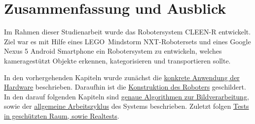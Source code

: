 \chapter{Zusammenfassung und Ausblick}
\label{cha:Fazit}

Im Rahmen dieser Studienarbeit wurde das Robotersystem CLEEN-R entwickelt. Ziel war es mit Hilfe eines LEGO\textregistered\ Mindstorm NXT-Robotersets und eines Google Nexus 5 Android Smartphone ein Robotersystem zu entwickeln, welches kameragestützt Objekte erkennen, kategorisieren und transportieren sollte. 

In den vorhergehenden Kapiteln wurde zunächst die \hyperref[cha:Materials]{konkrete Anwendung der Hardware}  beschrieben. Daraufhin ist die \hyperref[cha:robot]{Konstruktion des Roboters} geschildert. In den darauf folgenden Kapiteln sind \hyperref[cha:Software]{genaue Algorithmen zur Bildverarbeitung}, sowie der \hyperref[cha:Workloop]{allgemeine Arbeitszyklus} des Systems beschrieben. Zuletzt folgen \hyperref[cha:Tests]{Tests in geschützten Raum, sowie Realtests}.
